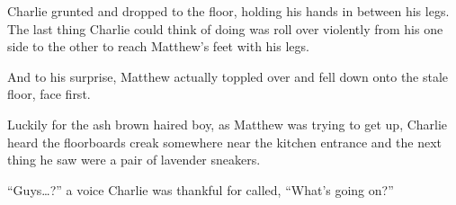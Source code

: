 Charlie grunted and dropped to the floor, holding his hands in between his legs. The last thing Charlie could think of doing was roll over violently from his one side to the other to reach Matthew’s feet with his legs.

And to his surprise, Matthew actually toppled over and fell down onto the stale floor, face first.

Luckily for the ash brown haired boy, as Matthew was trying to get up, Charlie heard the floorboards creak somewhere near the kitchen entrance and the next thing he saw were a pair of lavender sneakers.

“Guys…?” a voice Charlie was thankful for called, “What’s going on?”
